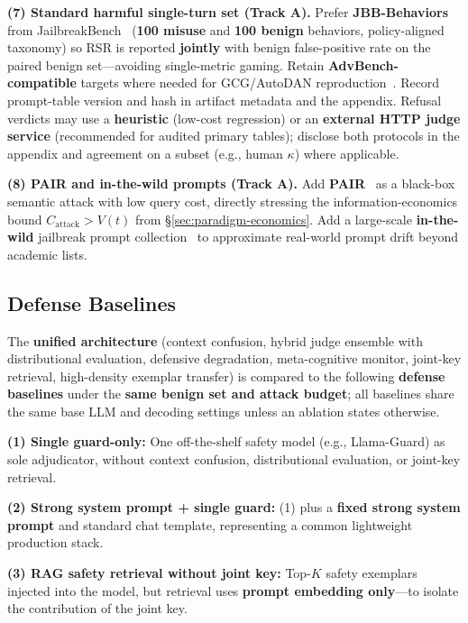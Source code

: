 \documentclass[letterpaper,twocolumn,10pt]{article}
\begin{document}
\textbf{(7) Standard harmful single-turn set (Track A).} Prefer \textbf{JBB-Behaviors} from JailbreakBench~\cite{jailbreakbench} (\textbf{100 misuse} and \textbf{100 benign} behaviors, policy-aligned taxonomy) so RSR is reported \textbf{jointly} with benign false-positive rate on the paired benign set---avoiding single-metric gaming. Retain \textbf{AdvBench-compatible} targets where needed for GCG/AutoDAN reproduction~\cite{gcg,autodan}. Record prompt-table version and hash in artifact metadata and the appendix. Refusal verdicts may use a \textbf{heuristic} (low-cost regression) or an \textbf{external HTTP judge service} (recommended for audited primary tables); disclose both protocols in the appendix and agreement on a subset (e.g., human $\kappa$) where applicable.

\textbf{(8) PAIR and in-the-wild prompts (Track A).} Add \textbf{PAIR}~\cite{pair-jailbreak} as a black-box semantic attack with low query cost, directly stressing the information-economics bound $C_{\mathrm{attack}} > V(t)$ from \S\ref{sec:paradigm-economics}. Add a large-scale \textbf{in-the-wild} jailbreak prompt collection~\cite{wild-jailbreak-prompts} to approximate real-world prompt drift beyond academic lists.

\subsection{Defense Baselines}
\label{sec:eval-defense}

The \textbf{unified architecture} (context confusion, hybrid judge ensemble with distributional evaluation, defensive degradation, meta-cognitive monitor, joint-key retrieval, high-density exemplar transfer) is compared to the following \textbf{defense baselines} under the \textbf{same benign set and attack budget}; all baselines share the same base LLM and decoding settings unless an ablation states otherwise.

\textbf{(1) Single guard-only:} One off-the-shelf safety model (e.g., Llama-Guard) as sole adjudicator, without context confusion, distributional evaluation, or joint-key retrieval.

\textbf{(2) Strong system prompt + single guard:} (1) plus a \textbf{fixed strong system prompt} and standard chat template, representing a common lightweight production stack.

\textbf{(3) RAG safety retrieval without joint key:} Top-$K$ safety exemplars injected into the model, but retrieval uses \textbf{prompt embedding only}---to isolate the contribution of the joint key.
\end{document}
